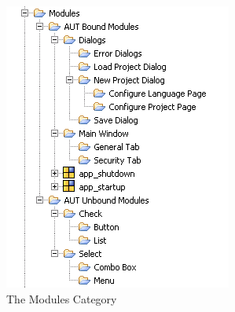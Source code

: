 \begin{figure}[h]
\begin{center}
\includegraphics{BestPractices/Structure/PS/ModulesCategory}
\caption{The Modules Category}
\label{ModulesCategory}
\end{center}
\end{figure} 

